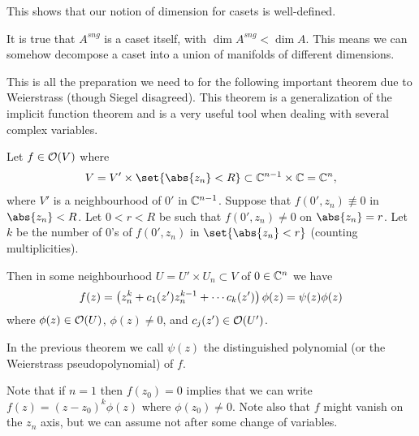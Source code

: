 This shows that our notion of dimension for casets is well-defined.

\begin{remark}
    It is true that $A^{sng}$ is a caset itself, with $\dim A^{sng} < \dim A$. This means we can somehow decompose a caset into a union of manifolds of different dimensions.
\end{remark}

This is all the preparation we need to for the following important theorem due to Weierstrass (though Siegel disagreed). This theorem is a generalization of the implicit function theorem and is a very useful tool when dealing with several complex variables.

\begin{theorem}
    Let $f \in \mathcal{O}(V)$ where
    \begin{align*}
        V = V' \times \set{ \abs{z_n} < R} \subset \C^{n-1} \times \C = \C^n,
    \end{align*}
    where $V'$ is a neighbourhood of $0'$ in $\mathbb{C}^{n-1}$. Suppose that $f(0',z_n) \not\equiv 0$ in $\abs{z_n} < R$. Let $0 < r< R$ be such that $f(0' , z_n) \neq 0$ on $\abs{z_n} = r$. Let $k$ be the number of $0$'s of $f(0' , z_n)$ in $\set{\abs{z_n} < r}$ (counting multiplicities).

    Then in some neighbourhood $U = U' \times U_n \subset V$ of $0 \in \mathbb{C}^n$ we have
    \begin{align*}
        f(z) = \left( z_n^k + c_1 (z' ) z_n^{k-1} + \cdots c_k(z')  \right) \phi (z) = \psi(z) \phi(z)
    \end{align*}
    where $\phi(z) \in \mathcal{O}(U)$, $\phi(z) \neq 0$, and $c_j(z') \in \mathcal{O}(U')$.
\end{theorem}

\begin{note}
    In the previous theorem we call $\psi(z)$ the distinguished polynomial (or the Weierstrass pseudopolynomial) of $f$.
\end{note}

\begin{remark}
    Note that if $n=1$ then $f(z_0) = 0$ implies that we can write $f(z) = (z-z_0)^k \phi(z)$ where $\phi(z_0) \neq 0$. Note also that $f$ might vanish on the $z_n$ axis, but we can assume not after some change of variables.
\end{remark}


